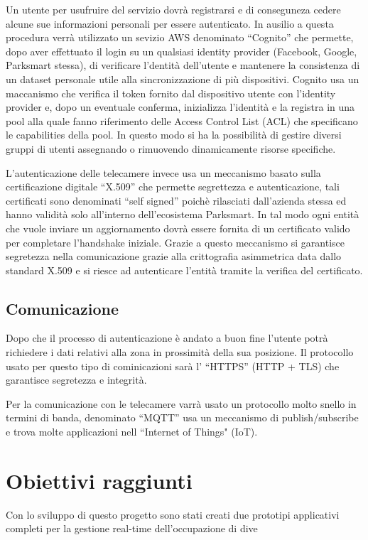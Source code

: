 Un utente per usufruire del servizio dovrà registrarsi e di conseguneza cedere alcune sue informazioni personali per essere autenticato. In ausilio a questa procedura verrà utilizzato un sevizio AWS denominato ``Cognito'' che permette, dopo aver effettuato il login su un qualsiasi identity provider (Facebook, Google, Parksmart stessa), di verificare l'dentità dell'utente e mantenere la consistenza di un dataset personale utile alla sincronizzazione di più dispositivi. Cognito usa un maccanismo che verifica il token fornito dal dispositivo utente con l'identity provider e, dopo un eventuale conferma, inizializza l'identità e la registra in una pool alla quale fanno riferimento delle Access Control List (ACL) che specificano le capabilities della pool. In questo modo si ha la possibilità di gestire diversi gruppi di utenti assegnando o rimuovendo dinamicamente risorse specifiche.

L'autenticazione delle telecamere invece usa un meccanismo basato sulla certificazione digitale ``X.509'' che permette segrettezza e autenticazione, tali certificati sono denominati ``self signed'' poichè rilasciati dall'azienda stessa ed hanno validità solo all'interno dell'ecosistema Parksmart. In tal modo ogni entità che vuole inviare un aggiornamento dovrà essere fornita di un certificato valido per completare l'handshake iniziale. Grazie a questo meccanismo si garantisce segretezza nella comunicazione grazie alla crittografia asimmetrica data dallo standard X.509 e si riesce ad autenticare l'entità tramite la verifica del certificato.

\subsection*{Comunicazione}
Dopo che il processo di autenticazione è andato a buon fine l'utente potrà richiedere i dati relativi alla zona in prossimità della sua posizione. Il protocollo usato per questo tipo di cominicazioni sarà l' ``HTTPS'' (HTTP + TLS) che garantisce segretezza e integrità.

Per la comunicazione con le telecamere varrà usato un protocollo molto snello in termini di banda, denominato ``MQTT'' usa un meccanismo di publish/subscribe e trova molte applicazioni nell ``Internet of Things" (IoT).

\section{Obiettivi raggiunti}
Con lo sviluppo di questo progetto sono stati creati due prototipi applicativi completi per la gestione real-time dell'occupazione di dive


